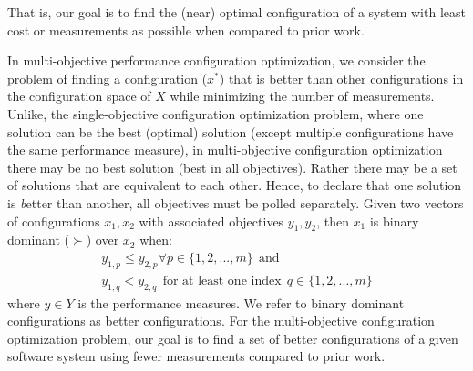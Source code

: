 \noindent That is, our goal is to find the (near) optimal configuration of a system with least cost or measurements as possible when compared to prior work.
 
 
In multi-objective performance configuration optimization,
we consider the problem of finding a  configuration ($x^*$) that is better than other configurations in the configuration space of $X$ while minimizing the number of measurements. Unlike, the single-objective configuration optimization problem, where one solution can be the best (optimal) solution (except multiple configurations have the same performance measure), in multi-objective configuration optimization there may be no best solution (best in all objectives). Rather there may be a set of solutions that are equivalent to each other. Hence,
to declare that one solution is {\emph better} than another, all objectives must be polled separately. Given two vectors of configurations $x_1,x_2$ with associated objectives $y_{1}, y_{2}$,
then $x_1$ is binary dominant ($\succ$) over $x_2$ when:
\begin{equation}\label{eq:bdom}
    \begin{gathered}
            y_{1,p} \le y_{2,p} \forall p \in \{1, 2,..., m\}~~\text{and}\\
            y_{1,q} < y_{2, q}~~\text{for at least one index}~~q \in \{1, 2,...,m\}
    \end{gathered}
\end{equation}
where \textit{$y\in Y$} is the performance measures. We refer to binary dominant configurations as better configurations. For the multi-objective configuration optimization problem, our goal is to find a set of  better configurations of a given software system using fewer measurements compared to prior work.




